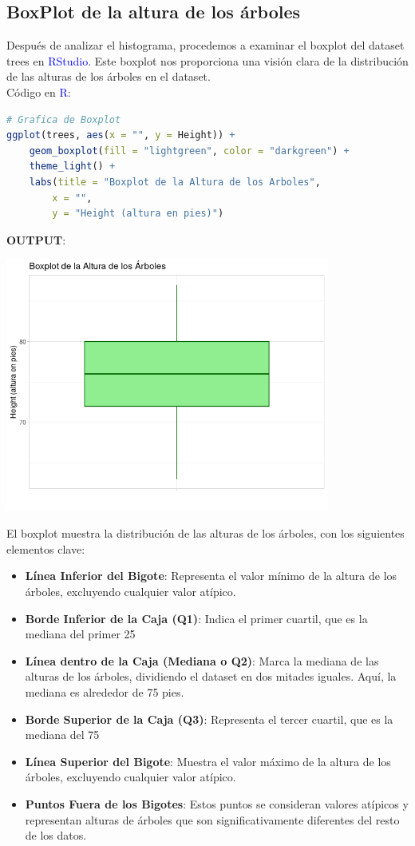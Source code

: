 \documentclass{article}
\begin{document}
\subsection{BoxPlot de la altura de los árboles}
Después de analizar el histograma, procedemos a examinar el boxplot del dataset trees en \textcolor{blue}{RStudio}. Este boxplot nos proporciona una visión clara de la distribución de las alturas de los árboles en el dataset.\\
Código en \textcolor{blue}{R}:
\begin{lstlisting}[language=R, caption=BoxPlot de la altura de los árboles]
# Grafica de Boxplot
ggplot(trees, aes(x = "", y = Height)) +
    geom_boxplot(fill = "lightgreen", color = "darkgreen") +
    theme_light() +
    labs(title = "Boxplot de la Altura de los Arboles",
        x = "",
        y = "Height (altura en pies)")
\end{lstlisting}
\textbf{OUTPUT}:
\begin{center} 
\includegraphics[width=0.8\textwidth]{code/Plots/BoxPlot.png}
\end{center}
El boxplot muestra la distribución de las alturas de los árboles, con los siguientes elementos clave:
\begin{itemize}
    \item \textbf{Línea Inferior del Bigote}: Representa el valor mínimo de la altura de los árboles, excluyendo cualquier valor atípico.
    \item \textbf{Borde Inferior de la Caja (Q1)}: Indica el primer cuartil, que es la mediana del primer 25%
    \item \textbf{Línea dentro de la Caja (Mediana o Q2)}: Marca la mediana de las alturas de los árboles, dividiendo el dataset en dos mitades iguales. Aquí, la mediana es alrededor de 75 pies.
    \item \textbf{Borde Superior de la Caja (Q3)}: Representa el tercer cuartil, que es la mediana del 75%
    \item \textbf{Línea Superior del Bigote}: Muestra el valor máximo de la altura de los árboles, excluyendo cualquier valor atípico.
    \item \textbf{Puntos Fuera de los Bigotes}: Estos puntos se consideran valores atípicos y representan alturas de árboles que son significativamente diferentes del resto de los datos.
\end{itemize}
\end{document}
